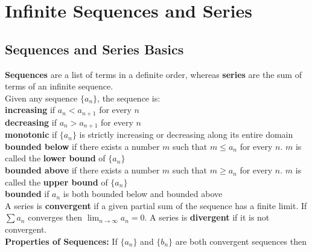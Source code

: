 \section{Infinite Sequences and Series}

    \subsection{Sequences and Series Basics}
        \color{purple} \textbf{Sequences} \color{black} are a list of terms in a definite order,
        whereas \color{purple} \textbf{series} \color{black} are the sum of terms of an infinite
        sequence. \\

        \noindent Given any sequence $\{a_n\}$, the sequence is: \\
        \noindent \color{purple} \textbf{increasing} \color{black} if $a_n<a_{n+1}$ for every $n$ \\
        \noindent \color{purple} \textbf{decreasing} \color{black} if $a_n>a_{n+1}$ for every $n$ \\
        \noindent \color{purple} \textbf{monotonic} \color{black} if $\{a_n\}$ is strictly
        increasing or decreasing along its entire domain \\
        \noindent \color{purple} \textbf{bounded below} \color{black} if there exists a number
        $m$ such that $m\leq a_n$ for every $n$. $m$ is called the \color{purple} \textbf{lower bound}
        \color{black} of $\{a_n\}$ \\
        \noindent \color{purple} \textbf{bounded above} \color{black} if there exists a number
        $m$ such that $m\geq a_n$ for every $n$. $m$ is called the \color{purple} \textbf{upper bound}
        \color{black} of $\{a_n\}$ \\
        \noindent \color{purple} \textbf{bounded} \color{black} if $a_n$ is both bounded below
        and bounded above \\

        \noindent A series is \color{purple} \textbf{convergent} \color{black} if a given partial
        sum of the sequence has a finite limit. If $\sum a_n$ converges then $\lim_{n\rightarrow\infty}a_n=0$.
        A series is \color{purple} \textbf{divergent} \color{black} if it is not convergent. \\

        \noindent \color{purple} \textbf{Properties of Sequences:} \color{black}
        \noindent If $\{a_n\}$ and $\{b_n\}$ are both convergent sequences then

